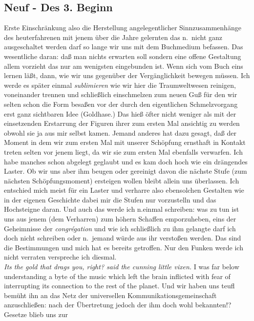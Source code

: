 \documentclass[
]{article}
\author{}
\date{\vspace{-2.5em}}
\begin{document}
\subsection{Neuf - Des 3. Beginn}\label{neuf---des-3.-beginn}

Erste Einschränkung also die Herstellung angelegentlicher
Sinnzusammenhänge des heuterfahrenen mit jenem über die Jahre gelernten
das n.~nicht ganz ausgeschaltet werden darf so lange wir uns mit dem
Buchmedium befassen. Das wesentliche daran: daß man nichts erwarten soll
sondern eine offene Gestaltung allem vorzieht das nur am wenigsten
eingebunden ist. Wenn sich vom Buch eins lernen läßt, dann, wie wir uns
gegenüber der Vergänglichkeit bewegen müssen. Ich werde es später einmal
\emph{sublimieren} wie wir hier die Traumweltwesen reinigen, voneinander
trennen und schließlich einschmelzen zum neuen Guß für den wir selten
schon die Form besaßen vor der durch den eigentlichen Schmelzvorgang
erst ganz sichtbaren Idee (Goldhase.) Das hieß öfter nicht weniger als
mit der einsetzenden Erstarrung der Figuren ihrer zum ersten Mal
ansichtig zu werden obwohl sie ja aus mir selbst kamen. Jemand anderes
hat dazu gesagt, daß der Moment in dem wir zum ersten Mal mit unserer
Schöpfung ernsthaft in Kontakt treten selten vor jenem liegt, da wir sie
zum ersten Mal ebenfalls verwarfen. Ich habe manches schon abgelegt
geglaubt und es kam doch hoch wie ein drängendes Laster. Ob wir uns aber
ihm beugen oder gereinigt davon die nächste Stufe (zum nächsten
Schöpfungsmoment) ersteigen wollen bleibt allein uns überlassen. Ich
entschied mich meist für ein Laster und verharre also ebensolchen
Gestalten wie in der eigenen Geschichte dabei mir die Stufen nur
vorzustelln und das Hochsteigne daran. Und auch das werde ich n.einmal
schreiben: was zu tun ist uns aus jenem (dem Verharren) zum höhern
Schaffen emporzuheben, eins der Geheimnisse der \emph{congrégation} und
wie ich schließlich zu ihm gelangte darf ich doch nicht schreiben oder
n.~jemand würde aus ihr verstoßen werden. Das sind die Bestimmungen und
mich hat es bereits getroffen. Nur den Funken werde ich nicht verraten
verspreche ich diesmal.\\
\emph{It\textquotesingle s the gold that drags you, right? said the
cunning little vixen.} I was far below understanding a byte of the music
which left the brain inflicted with fear of interrupting its connection
to the rest of the planet. Und wir haben uns teufl bemüht ihn an das
Netz der universellen Kommunikationsgemeinschaft anzuschließen: nach der
Übertretung jedoch der ihm doch wohl bekannten!? Gesetze blieb uns zur
\end{document}
